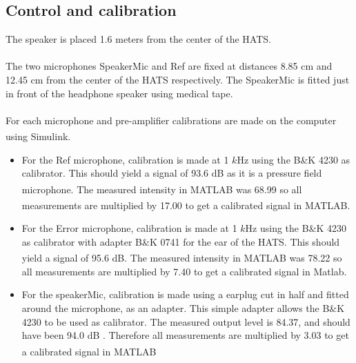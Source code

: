 \subsection{Control and calibration}
The speaker is placed 1.6 meters from the center of the HATS. \\\\
The two microphones SpeakerMic and Ref are fixed at distances 8.85 cm and 12.45 cm from the center of the HATS respectively. The SpeakerMic is fitted just in front of the headphone speaker using medical tape.\\\\
For each microphone and pre-amplifier calibrations are made on the computer using Simulink\textsuperscript{\textregistered}.
\begin{itemize}
	\item For the Ref microphone, calibration is made at 1 $k$Hz using the B\&K 4230 as calibrator. This should yield a signal of 93.6 dB as it is a pressure field microphone. The measured intensity in MATLAB\textsuperscript{\textregistered} was 68.99 so all measurements are multiplied by 17.00 to get a calibrated signal in MATLAB\textsuperscript{\textregistered}. 
	\item For the Error microphone, calibration is made at 1 $k$Hz using the B\&K 4230 as calibrator with adapter B\&K 0741 for the ear of the HATS. This should yield a signal of 95.6 dB. The measured intensity in MATLAB\textsuperscript{\textregistered} was 78.22 so all measurements are multiplied by 7.40 to get a calibrated signal in Matlab. 
	\item For the speakerMic, calibration is made using a earplug cut in half and fitted around the microphone, as an adapter. This simple adapter allows the B\&K 4230 to be used as calibrator. The measured output level is 84.37, and should have been 94.0 dB . Therefore all measurements are multiplied by 3.03 to get a calibrated signal in MATLAB\textsuperscript{\textregistered}
\end{itemize}
 
